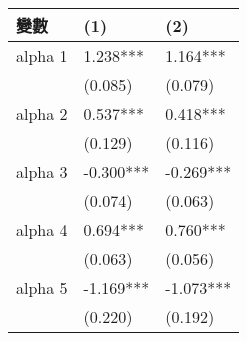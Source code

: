 \begin{tabular}{lll}
  \hline
變數 & (1) & (2) \\ 
  \hline
alpha 1 & 1.238*** & 1.164*** \\ 
   & (0.085) & (0.079) \\ 
  alpha 2 & 0.537*** & 0.418*** \\ 
   & (0.129) & (0.116) \\ 
  alpha 3 & -0.300*** & -0.269*** \\ 
   & (0.074) & (0.063) \\ 
  alpha 4 & 0.694*** & 0.760*** \\ 
   & (0.063) & (0.056) \\ 
  alpha 5 & -1.169*** & -1.073*** \\ 
   & (0.220) & (0.192) \\ 
   \hline
\end{tabular}
